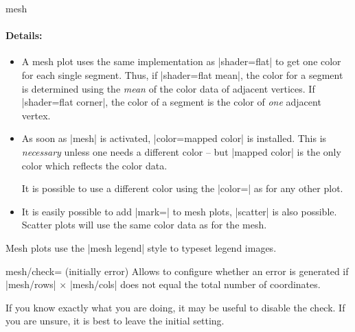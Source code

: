 \begin{plottype}[/pgfplots]{mesh}
	\paragraph{Details:}
	\begin{itemize}
		\item 
	A mesh plot uses the same implementation as |shader=flat| to get one color for each single segment. Thus, if |shader=flat mean|, the color for a segment is determined using the \emph{mean} of the color data of adjacent vertices. If |shader=flat corner|, the color of a segment is the color of \emph{one} adjacent vertex.
		\item As soon as |mesh| is activated, |color=mapped color| is installed. This is \emph{necessary} unless one needs a different color -- but |mapped color| is the only color which reflects the color data.

		It is possible to use a different color using the |color=| as for any other plot.

		\item It is easily possible to add |mark=| to mesh plots, |scatter| is also possible. Scatter plots will use the same color data as for the mesh.
	\end{itemize}

\pgfplotsexpensiveexample
\begin{codeexample}[]
\end{codeexample}
	
	Mesh plots use the |mesh legend| style to typeset legend images.
\end{plottype}

\begin{pgfplotskey}{mesh/check= (initially error)}
	Allows to configure whether an error is generated if |mesh/rows| $\times$ |mesh/cols| does not equal the total number of coordinates.

	If you know exactly what you are doing, it may be useful to disable the check. If you are unsure, it is best to leave the initial setting.
\end{pgfplotskey}

